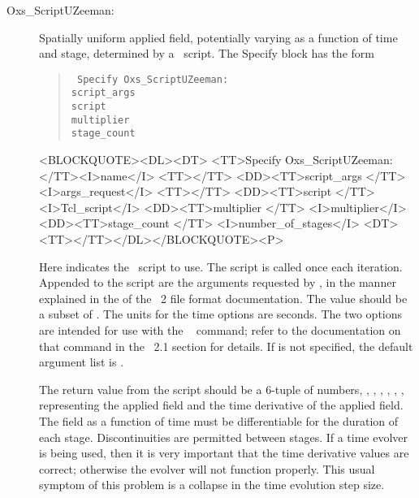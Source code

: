 \begin{description}
%
\item[Oxs\_ScriptUZeeman:]
   Spatially uniform applied field,
   potentially varying as a function of time and stage, determined by a
   \Tcl\ script.  The Specify block has the form
      \begin{latexonly}
      \begin{quote}\tt
      Specify Oxs\_ScriptUZeeman: \ocb\\
       \bi script\_args \ocb{}\ccb\\
       \bi script \\
       \bi multiplier \\
       \bi stage\_count  \\
      \ccb
      \end{quote}
      \end{latexonly}
      \begin{rawhtml}
      <BLOCKQUOTE><DL><DT>
      <TT>Specify Oxs_ScriptUZeeman:</TT><I>name</I> <TT>{</TT>
      <DD><TT>script_args {</TT> <I>args_request</I> <TT>}</TT>
      <DD><TT>script </TT> <I>Tcl_script</I>
      <DD><TT>multiplier </TT> <I>multiplier</I>
      <DD><TT>stage_count </TT> <I>number_of_stages</I>
      <DT><TT>}</TT></DL></BLOCKQUOTE><P>
      \end{rawhtml}
   Here  indicates the \Tcl\ script to use.  The script
   is called once each iteration.  Appended to the script are the
   arguments requested by , in the manner
   explained in the 
    of the \MIF~2 file format documentation.  The value
    should be a subset of .
   The units for the time options are seconds.  The two
    options are intended for use with the
   \MIF\  command;
   refer to the documentation on that command in the \MIF~2.1 section
   for details.  If  is not specified, the default
   argument list is .

   The return value from the script should be a 6-tuple of numbers,
   \ocb{}, , , , , \ccb,
   representing the applied field and the time derivative of the applied
   field.  The field as a function of time must be differentiable for
   the duration of each stage.  Discontinuities are permitted between
   stages.  If a time evolver is being used, then it is very important
   that the time derivative values are correct; otherwise the evolver
   will not function properly.  This usual symptom of this problem is a
   collapse in the time evolution step size.


\end{description}
